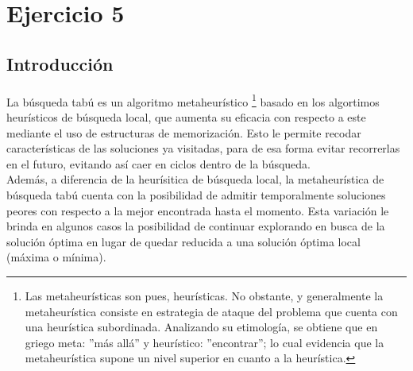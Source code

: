 \section{Ejercicio 5}

\subsection{Introducción}

\paragraph{}
La búsqueda tabú es un algoritmo metaheurístico \footnote{
Las metaheurísticas son pues, heurísticas. No obstante, y generalmente la metaheurística consiste en estrategia de ataque del problema que cuenta con una heurística subordinada. Analizando su etimología, se obtiene que en griego meta: ''más allá'' y heurístico: ''encontrar''; lo cual evidencia que la metaheurística supone un nivel superior en cuanto a la heurística.} basado en los algortimos heurísticos de búsqueda local, que aumenta su eficacia con respecto a este mediante el uso de estructuras de memorización. Esto le permite recodar características de las soluciones ya visitadas, para de esa forma evitar recorrerlas en el futuro, evitando así caer en ciclos dentro de la búsqueda. \\
Además, a diferencia de la heurísitica de búsqueda local, la metaheurística de búsqueda tabú cuenta con la posibilidad de admitir temporalmente soluciones peores con respecto a la mejor encontrada hasta el momento. Esta variación le brinda en algunos casos la posibilidad de continuar explorando en busca de la solución óptima en lugar de quedar reducida a una solución óptima local (máxima o mínima).

